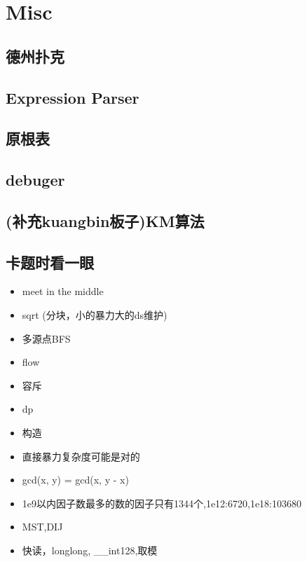 \section{Misc}

\subsection{德州扑克}


\subsection{Expression Parser}


\subsection{原根表}


\subsection{debuger}


\subsection{(补充kuangbin板子)KM算法}


\subsection{卡题时看一眼}
\begin{itemize}
    \item meet in the middle
    \item sqrt (分块，小的暴力大的ds维护)
    \item 多源点BFS
    \item flow
    \item 容斥
    \item dp
    \item 构造
    \item 直接暴力复杂度可能是对的
    \item gcd(x, y) = gcd(x, y - x)
    \item 1e9以内因子数最多的数的因子只有1344个,1e12:6720,1e18:103680
    \item MST,DIJ
    \item 快读，longlong, \_\_int128,取模
\end{itemize}